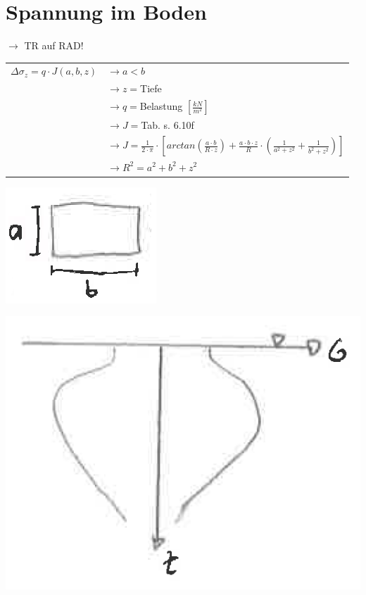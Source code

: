 \section{Spannung im Boden}
\begin{minipage}[t]{0.25\linewidth}
		$\rightarrow$ TR auf RAD!
		\vspace{\baselineskip} \\
		\begin{tabular}{ll}
		$\Delta \sigma_z=q \cdot J(a,b,z)$	& $\rightarrow a<b$ \\
											& $\rightarrow z=$Tiefe \\
											& $\rightarrow q=$Belastung $\left[\frac{kN}{m^2}\right]$ \\
											& $\rightarrow J=$Tab. s. 6.10f \\
											& $\rightarrow J=\frac{1}{2\cdot \pi} \cdot \left[arctan(\frac{a \cdot b}{R \cdot z}) + \frac{a \cdot b \cdot z}{R} \cdot  \left(\frac{1}{a^2 + z^2} + \frac{1}{b^2 + z^2}\right) \right]$ \\
											& $\rightarrow R^2=a^2 + b^2 + z^2$ \\	
		\end{tabular}

 	\vspace{\baselineskip}
 \end{minipage}
 \begin{minipage}[t]{0.3\linewidth}
	\vspace{\baselineskip}
	\qquad \includegraphics[width=0.3\linewidth]{images/SpimBoden1.PNG}
 \end{minipage}
\begin{minipage}[t]{0.5\linewidth}
		\medskip
		\includegraphics[width=0.5\linewidth]{images/SpimBoden2Verlauf.PNG}
\end{minipage}
 	

